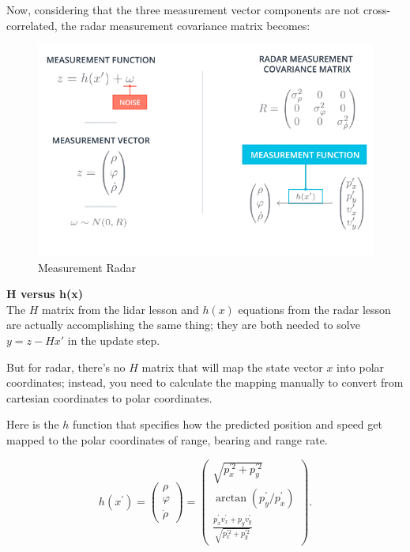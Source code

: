 \documentclass[11pt, a4paper]{article}
\begin{document}
Now, considering that the three measurement vector components are not cross-correlated, the radar measurement covariance matrix becomes:



\begin{figure}[htpb!]
	\centering
	\includegraphics[width=0.8\linewidth]{measurement_radar}
	\caption{Measurement Radar}
	\label{fig:measurement_radar}
\end{figure}




\textbf{H versus h(x)} \\

The $H$ matrix from the lidar lesson and $h(x)$ equations from the radar lesson are actually accomplishing the same thing; they are both needed to solve $y = z - Hx'$ in the update step.

But for radar, there's no $H$ matrix that will map the state vector $x$ into polar coordinates; instead, you need to calculate the mapping manually to convert from cartesian coordinates to polar coordinates.

Here is the $h$ function that specifies how the predicted position and speed get mapped to the polar coordinates of range, bearing and range rate.


\[
	h\left(x^{\prime}\right)=\left(\begin{array}{c}{\rho} \\ {\varphi} \\ {\dot{\rho}}\end{array}\right)= \left(\begin{array}{c}{\sqrt{p_{x}^{\prime 2}+p^{\prime2}_{y}}} \\ 
	{\operatorname{arctan}\left(p_{y}^{\prime} / p_{x}^{\prime}\right)} \\ 
{\frac{p_{x}^{\prime} v_{x}^{\prime}+p_{y} v_{y}^{\prime}}{\sqrt{p_{x}^{\prime2}+p_{y}^{\prime2}}}}\end{array}\right)
.\] 
\end{document}

